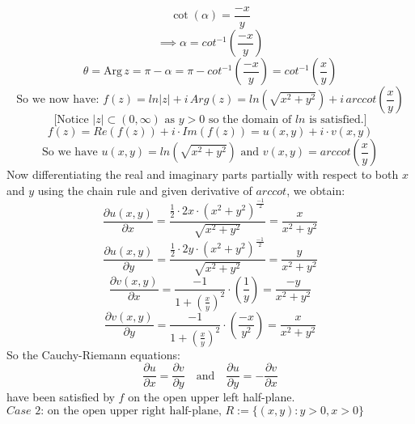 \documentclass[12pt]{article}
\begin{document}
\[
\cot\left(\alpha\right) = \frac{-x}{y}
\]
\[
\implies \alpha = cot^{-1}\left(\frac{-x}{y}\right)
\]
\[
\theta = \text{Arg} \, z = \pi - \alpha = \pi - cot^{-1}\left(\frac{-x}{y}\right) = cot^{-1}\left(\frac{x}{y}\right)
\]
\[
\text{So we now have: } f(z) = ln|z| + i\,Arg\left(z\right) = ln\left(\sqrt{x^2 + y^2}\right) + i\,arccot\left(\frac{x}{y}\right)
\]
\[
\text{[Notice } |z| \subset \left(0,\infty\right) \text{ as } y > 0 \text{ so the domain of } ln \text{ is satisfied.]}
\]
\[
f(z) = Re\left(f(z)\right) + i \cdot Im\left(f(z)\right) = u(x,y) + i \cdot v(x,y)
\]
\[
\text{So we have }u(x,y) = ln\left(\sqrt{x^2 + y^2}\right) \text{ and } v(x,y) = arccot\left(\frac{x}{y}\right)
\]
Now differentiating the real and imaginary parts partially with respect to both \(x\) and \(y\) using the chain rule and given derivative of \(arccot\), we obtain:
\[
\frac{\partial u(x,y)}{\partial x} = \frac{\frac{1}{2} \cdot 2x\cdot \left(x^2+y^2\right)^{\frac{-1}{2}}}{\sqrt{x^2+y^2}} = \frac{x}{x^2+y^2}
\]
\[
\frac{\partial u(x,y)}{\partial y} = \frac{\frac{1}{2} \cdot 2y\cdot \left(x^2+y^2\right)^{\frac{-1}{2}}}{\sqrt{x^2+y^2}} = \frac{y}{x^2+y^2}
\]
\[
\frac{\partial v(x,y)}{\partial x} = \frac{-1}{1 + \left(\frac{x}{y}\right)^2}\cdot \left(\frac{1}{y}\right) = \frac{-y}{x^2+y^2}
\]
\[
\frac{\partial v(x,y)}{\partial y} = \frac{-1}{1 + \left(\frac{x}{y}\right)^2}\cdot \left(\frac{-x}{y^2}\right) = \frac{x}{x^2+y^2}
\]
So the Cauchy-Riemann equations:
\[
\frac{\partial u}{\partial x} = \frac{\partial v}{\partial y} \quad \text{and} \quad \frac{\partial u}{\partial y} = -\frac{\partial v}{\partial x}
\]
have been satisfied by \(f\) on the open upper left half-plane.
\[\]
\(\textit{Case 2: } \text{on the open upper right half-plane, } R := \{\left(x,y\right): y > 0, x > 0\}\)
\end{document}
